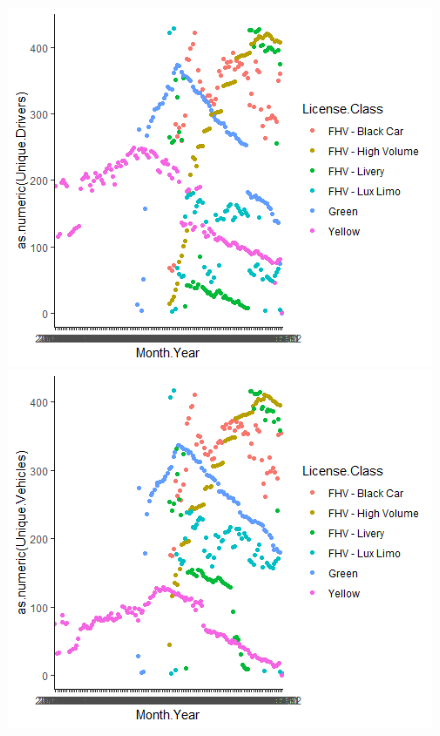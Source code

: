 \documentclass[11pt,a4paper]{article}
\begin{document}
\begin{enumerate}
\begin{description}
              \begin{figure}[p]
                 \centering
                 \includegraphics[width=14cm]{PS6b_LIU.png}
                 \includegraphics[width=14cm]{PS6c_LIU.png}
              \end{figure}
              
          \end{description}       

          
\end{enumerate}
\end{document}
